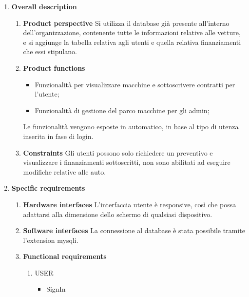 \documentclass[12pt]{article}
\begin{document}
\begin{enumerate}
\begin{enumerate}
    
  \end{enumerate}
  \newpage
  \item\textbf{\large Overall description} 
   \begin{enumerate}
    \item\textbf{Product perspective} \newline
    Si utilizza il database già presente all'interno dell'organizzazione, contenente tutte le informazioni relative alle vetture, e si aggiunge la tabella relativa agli utenti e quella relativa finanziamenti che essi stipulano.
    \bigskip
    \item\textbf{Product functions} \newline
    \begin{itemize}
     \item Funzionalità per visualizzare macchine e sottoscrivere contratti per l'utente;
     \item Funzionalità di gestione del parco macchine per gli admin;
    \end{itemize}
    \bigskip
    Le funzionalità vengono esposte in automatico, in base al tipo di utenza inserita in fase di login.
    \item\textbf{Constraints} \newline
    Gli utenti possono solo richiedere un preventivo e visualizzare i finanziamenti sottoscritti,
    non sono abilitati ad eseguire modifiche relative alle auto.
  \end{enumerate}
  \item\textbf{\large Specific requirements} 
  \begin{enumerate}
    \item\textbf{Hardware interfaces} \newline
    L'interfaccia utente è responsive, così che possa adattarsi alla dimensione dello schermo di qualsiasi dispositivo.
    \item\textbf{Software interfaces} \newline
    La connessione al database è stata possibile tramite l'extension mysqli.
    \newpage
    \item\textbf{Functional requirements} \newline
    \begin{enumerate}
      \item{USER}
    \begin{itemize}
      \item{SignIn} \newline
    

\end{itemize}
\end{enumerate}
\end{enumerate}
\end{enumerate}
\end{document}
